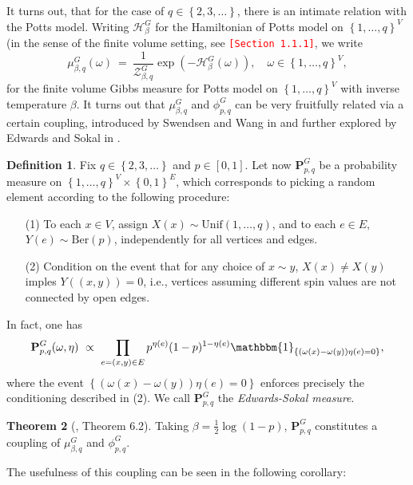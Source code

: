 \documentclass[12pt]{article}
\renewcommand{\H}{\mathcal{H}}
\newcommand{\PP}{\mathbf{P}}
\newcommand{\ZZ}{\mathcal{Z}}
\newcommand{\set}[1]{\left\{#1\right\}}
\newcommand{\1}{\mathbbm{1}}
\newcommand{\5}{\vspace{0.5cm}}
\theoremstyle{definition}
\newtheorem{thm}{Theorem}[section]
\newtheorem{df}[thm]{Definition}
\begin{document}
It turns out, that for the case of $q\in\set{2,3,\ldots}$, there is an intimate relation with the Potts model. Writing $\H_\beta^G$ for the Hamiltonian of Potts model on $\set{1,\ldots,q}^V$ (in the sense of the finite volume setting, see \textcolor{red}{\texttt{[Section 1.1.1]}}, we write
$$\mu_{\beta,q}^G(\omega) ~=~ \frac{1}{\ZZ_{\beta,q}^G}\exp(-\H_\beta^G(\omega)), \quad \omega\in\set{1,\ldots,q}^V,$$
for the finite volume Gibbs measure for Potts model on $\set{1,\ldots,q}^V$ with inverse temperature $\beta$. It turns out that $\mu_{\beta,q}^G$ and $\phi_{p,q}^G$ can be very fruitfully related via a certain coupling, introduced by Swendsen and Wang in \cite{SW} and further explored  by Edwards and Sokal in \cite{ES}.

\begin{df}
Fix $q\in\set{2,3,\ldots}$ and $p\in[0,1]$. Let now $\PP_{p,q}^G$ be a probability measure on $\set{1,\ldots,q}^V\times\set{0,1}^E$, which corresponds to picking a random element according to the following procedure:
\begin{itemize}
	\item[(1)] To each $x\in V$, assign $X(x)\sim\mathrm{Unif}(1,\ldots,q)$, and to each $e\in E$, $Y(e)\sim\mathrm{Ber}(p)$, independently for all vertices and edges.
	\item[(2)] Condition on the event that for any choice of $x\sim y$, $X(x)\neq X(y)$ imples $Y((x,y))=0$, i.e., vertices assuming different spin values are not connected by open edges.
\end{itemize}
In fact, one has
$$\PP_{p,q}^G(\omega,\eta) ~\propto~ \prod_{e=(x,y)\in E}p^{\eta(e)}(1-p)^{1-\eta(e)}\1_{\set{(\omega(x)-\omega(y))\eta(e)=0}},$$
where the event $\set{(\omega(x)-\omega(y))\eta(e)=0}$ enforces precisely the conditioning described in (2). We call $\PP_{p,q}^G$ the \textit{Edwards-Sokal measure}.
\end{df}

\begin{thm}[\cite{GHM}, Theorem 6.2]
Taking $\beta=\frac{1}{2}\log(1-p)$, $\PP_{p,q}^G$ constitutes a coupling of $\mu_{\beta,q}^G$ and $\phi_{p,q}^G$.	
\end{thm}

The usefulness of this coupling can be seen in the following corollary:
\end{document}
